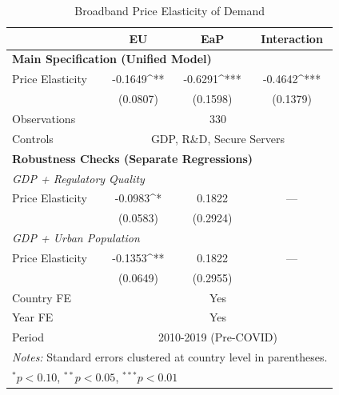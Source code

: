 \begin{table}[htbp]
\centering
\caption{Broadband Price Elasticity of Demand}
\label{tab:main_results}
\begin{tabular}{lccc}
\hline\hline
& EU & EaP & Interaction \\
\hline
\multicolumn{4}{l}{\textbf{Main Specification (Unified Model)}} \\
Price Elasticity & -0.1649^{**} & -0.6291^{***} & -0.4642^{***} \\
 & (0.0807) & (0.1598) & (0.1379) \\
Observations & \multicolumn{3}{c}{330} \\
Controls & \multicolumn{3}{c}{GDP, R\&D, Secure Servers} \\
\hline
\multicolumn{4}{l}{\textbf{Robustness Checks (Separate Regressions)}} \\
\multicolumn{4}{l}{\textit{GDP + Regulatory Quality}} \\
Price Elasticity & -0.0983^{*} & 0.1822 & --- \\
 & (0.0583) & (0.2924) & \\
\multicolumn{4}{l}{\textit{GDP + Urban Population}} \\
Price Elasticity & -0.1353^{**} & 0.1822 & --- \\
 & (0.0649) & (0.2955) & \\
\hline
Country FE & \multicolumn{3}{c}{Yes} \\
Year FE & \multicolumn{3}{c}{Yes} \\
Period & \multicolumn{3}{c}{2010-2019 (Pre-COVID)} \\
\hline\hline
\multicolumn{4}{l}{\textit{Notes:} Standard errors clustered at country level in parentheses.} \\
\multicolumn{4}{l}{$^{*}p<0.10$, $^{**}p<0.05$, $^{***}p<0.01$} \\
\end{tabular}
\end{table}